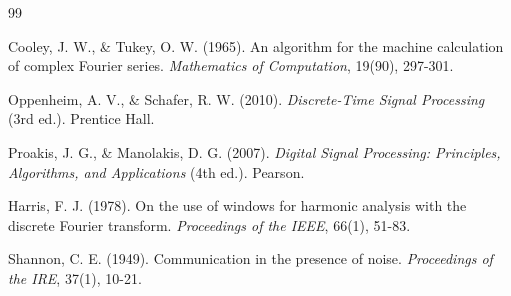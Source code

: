 \documentclass[11pt,a4paper]{article}
\begin{document}
\begin{thebibliography}{99}

Cooley, J. W., \& Tukey, O. W. (1965). An algorithm for the machine calculation of complex Fourier series. \emph{Mathematics of Computation}, 19(90), 297-301.

Oppenheim, A. V., \& Schafer, R. W. (2010). \emph{Discrete-Time Signal Processing} (3rd ed.). Prentice Hall.

Proakis, J. G., \& Manolakis, D. G. (2007). \emph{Digital Signal Processing: Principles, Algorithms, and Applications} (4th ed.). Pearson.

Harris, F. J. (1978). On the use of windows for harmonic analysis with the discrete Fourier transform. \emph{Proceedings of the IEEE}, 66(1), 51-83.

Shannon, C. E. (1949). Communication in the presence of noise. \emph{Proceedings of the IRE}, 37(1), 10-21.

\end{thebibliography}
\end{document}
